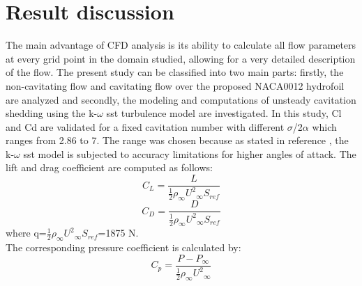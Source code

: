 \chapter{Result discussion}
The main advantage of CFD analysis is its ability to calculate all flow parameters 
at every grid point in the domain studied, allowing for a very detailed description of the
flow. The present study can be classified into two main parts: firstly, the
non-cavitating flow and cavitating flow over the proposed NACA0012 hydrofoil are analyzed and
secondly, the modeling and computations of unsteady cavitation shedding using the k-$\omega$ sst turbulence model are investigated. In this
study, Cl and Cd are validated for a fixed cavitation number with different $\sigma$/{2$\alpha$} which  
ranges from 2.86 to 7. The range was chosen because as stated in reference \cite{Zhao2021}, the k-$\omega$ sst model is subjected to accuracy limitations for higher angles of attack.
The lift and drag coefficient are computed as follows:
\begin{equation}
{C_L}=\frac{L}{{\frac{1}{2}}{{\rho}_{\infty}}{{{U}^2}_{\infty}}{S_{ref}}}
\end{equation}
\begin{equation}
{C_D}=\frac{D}{{\frac{1}{2}}{{\rho}_{\infty}}{{{U}^2}_{\infty}}{S_{ref}}}
\end{equation}
where q=${{\frac{1}{2}}{{\rho}_{\infty}}{{{U}^2}_{\infty}}{S_{ref}}}$=1875 N.\\ 
The corresponding pressure coefficient is calculated by:
\begin{equation}
{C_p}=\frac{P-{P_{\infty}}}{{\frac{1}{2}}{{\rho}_{\infty}}{{{U}^2}_{\infty}}}
\end{equation}
